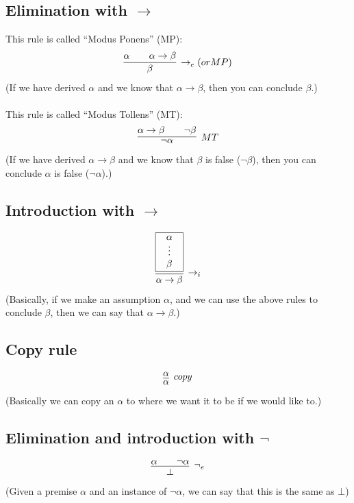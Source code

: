 \documentclass{article}
\newcommand{\rulename}[1]{#1}
\begin{document}
\subsection*{Elimination with $\to$}
    This rule is called ``Modus Ponens'' (MP):
    \begin{align*}
      \infer[\rulename{\to_e} (or \rulename{MP})]
      {\beta}
      {\alpha && \alpha \to \beta}
    \end{align*}
    (If we have derived $\alpha$ and we know that $\alpha\to\beta$, then you can conclude $\beta$.)
    \\\\This rule is called ``Modus Tollens'' (MT):
    \begin{align*}
      \infer[\rulename{MT}]
      {\neg\alpha}
      {\alpha \to \beta && \neg\beta}
    \end{align*}
    (If we have derived $\alpha \to \beta$ and we know that $\beta$ is false ($\neg\beta$), then you can conclude $\alpha$ is false ($\neg\alpha$).)
    
\subsection*{Introduction with $\to$}
    \begin{align*}
      \infer[\rulename{\to_i}]
      {\alpha \to \beta}
      {
        \framebox{\parbox{.8cm}{\centerline{$\alpha$}\centerline{$\vdots$}\centerline{$\beta$}}}
      }
    \end{align*}
    (Basically, if we make an assumption $\alpha$, and we can use the above rules to conclude $\beta$, then we can say that $\alpha\to\beta$.)
    
\subsection*{Copy rule}
    \begin{align*}
      \infer[\rulename{copy}]
      {\alpha}
      {\alpha}
    \end{align*}
    (Basically we can copy an $\alpha$ to where we want it to be if we would like to.)

\subsection*{Elimination and introduction with $\neg$}
    \begin{align*}
      \infer[\rulename{\neg_e}]
      {\bot}
      {\alpha && \neg \alpha}
    \end{align*}
    (Given a premise $\alpha$ and an instance of $\neg\alpha$, we can say that this is the same as $\bot$)
    
\end{document}
